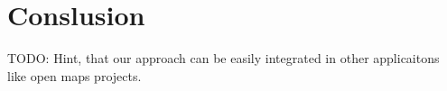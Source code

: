 \chapter{Conslusion}\label{chapter:conclusion}

TODO: Hint, that our approach can be easily integrated in other applicaitons like open maps projects.